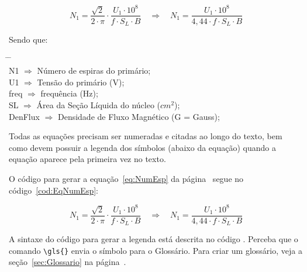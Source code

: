 \begin{equation}
    N_1 = \frac{\sqrt{2}}{2 \cdot \pi } \cdot \frac{U_1 \cdot  10^8}{f \cdot S_L \cdot B} \quad \Rightarrow \quad N_1 = \frac{U_1 \cdot 10^8}{4,44 \cdot f \cdot S_L \cdot B}
    \label{eq:NumEsp}
\end{equation}

Sendo que:\\
\vspace{-1.5cm}
\begin{tabbing}
    \hspace{1cm}  \= \hspace{1cm} \= \kill \\
    \gls{N1}      \> $\Rightarrow$ \> Número de espiras do primário; \\
    \gls{U1}      \> $\Rightarrow$ \> Tensão do primário (V); \\
    \gls{freq}    \> $\Rightarrow$ \> frequência (Hz); \\
    \gls{SL}      \> $\Rightarrow$ \> Área da Seção Líquida do núcleo ($cm^2$); \\
    \gls{DenFlux} \> $\Rightarrow$ \> Densidade de Fluxo Magnético (G = Gauss); 
\end{tabbing}

\vspace{4mm}
\begin{CaixaVermelha}
    Todas as equações precisam ser numeradas e citadas ao longo do texto, bem como devem possuir a legenda dos símbolos (abaixo da equação) quando a equação aparece pela primeira vez no texto.
\end{CaixaVermelha}


O código para gerar a equação~\ref{eq:NumEsp} da página~\pageref{eq:NumEsp} segue no código~\ref{cod:EqNumEsp}:

\begin{Codigo}[language=tex, 
    caption=Sintaxe para adicionar Equações, 
    label=cod:EqNumEsp]
\begin{equation}
   N_1=\frac{\sqrt{2}}{2 \cdot \pi } \cdot
   \frac{U_1 \cdot  10^8}{f \cdot S_L \cdot B}
   \quad \Rightarrow \quad 
   N_1=\frac{U_1 \cdot 10^8}{4,44 \cdot f \cdot S_L \cdot B}
   \label{eq:NumEsp}
\end{equation}
\end{Codigo}

A sintaxe do código para gerar a legenda está descrita no código . Perceba que o comando \verb|\gls{}| envia o símbolo para o Glossário. Para criar um glossário, veja a seção~\ref{sec:Glossario} na página~\pageref{sec:Glossario}.

